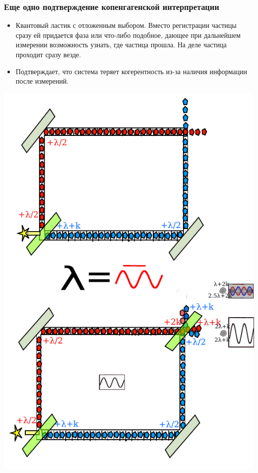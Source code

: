 \documentclass[10pt]{beamer}
\begin{document}
\begin{frame}[label=EPR-Copenhagen-support]%
  \frametitle{Еще одно подтверждение копенгагенской интерпретации}

  \begin{itemize}
    \item Квантовый ластик с отложенным выбором. Вместо регистрации 
      частицы сразу ей придается фаза или что-либо подобное, дающее при 
      дальнейшем измерении возможность узнать, где частица прошла. На 
      деле частица проходит сразу везде.
    \item Подтверждает, что система теряет когерентность из-за наличия 
      информации после измерений.
  \end{itemize}

  \vfill
  \centering
  \def\localheight{.4\textheight}
  \includegraphics[height=\localheight]{figures/quantum-eraser-classical}

\end{frame}
\end{document}
